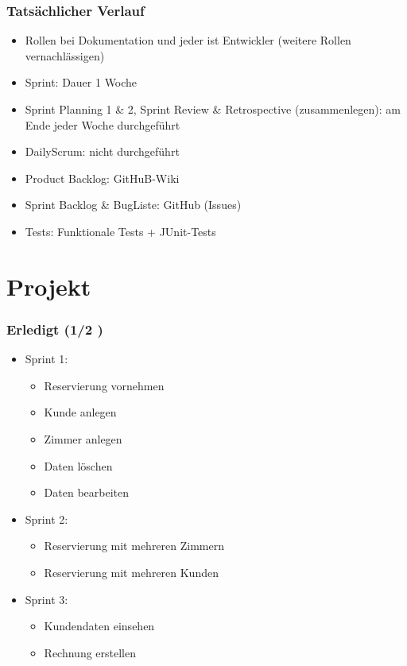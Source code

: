 \documentclass{beamer}
\begin{document}
\begin{frame}
\frametitle{Tats\"achlicher Verlauf}
\begin{itemize}
\item Rollen bei Dokumentation und jeder ist Entwickler (weitere Rollen vernachl\"assigen)
\item Sprint: Dauer 1 Woche
\end{itemize}
\begin{itemize}
\item Sprint Planning 1 \& 2, Sprint Review \& Retrospective (zusammenlegen): am Ende jeder Woche durchgef\"uhrt
\item DailyScrum: nicht durchgef\"uhrt
\end{itemize} 
\begin{itemize}
\item Product Backlog: GitHuB-Wiki
\item Sprint Backlog \& BugListe: GitHub (Issues)
\item Tests: Funktionale Tests + JUnit-Tests
\end{itemize}
\end{frame}

\section{Projekt} 

\begin{frame}
\frametitle{Erledigt (1/2 )} 
\begin{itemize}
\item  Sprint 1:
\begin{itemize}
\item  Reservierung vornehmen
\item  Kunde anlegen
\item  Zimmer anlegen
\item  Daten l\"oschen
\item  Daten bearbeiten
\end{itemize}
\item  Sprint 2:
\begin{itemize}
\item  Reservierung mit mehreren Zimmern
\item  Reservierung mit mehreren Kunden
\end{itemize}
\item  Sprint 3:
\begin{itemize}
\item  Kundendaten einsehen
\item  Rechnung erstellen
\end{itemize}
\end{itemize}
\end{frame}
\end{document}
